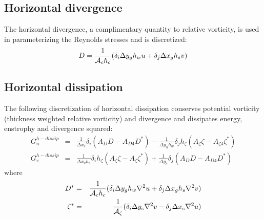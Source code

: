 \subsection{Horizontal divergence}

The horizontal divergence, a complimentary quantity to relative
vorticity, is used in parameterizing the Reynolds stresses and is
discretized:
\begin{equation}
D = \frac{1}{{\cal A}_c h_c} (
  \delta_i \Delta y_g h_w u
+ \delta_j \Delta x_g h_s v )
\end{equation}



\subsection{Horizontal dissipation}

The following discretization of horizontal dissipation conserves
potential vorticity (thickness weighted relative vorticity) and
divergence and dissipates energy, enstrophy and divergence squared:
\begin{eqnarray}
G_u^{h-dissip} & = &
  \frac{1}{\Delta x_c} \delta_i ( A_D D - A_{D4} D^*)
- \frac{1}{\Delta y_u h_w} \delta_j h_\zeta ( A_\zeta \zeta - A_{\zeta4} \zeta^* )
\\
G_v^{h-dissip} & = &
  \frac{1}{\Delta x_v h_s} \delta_i h_\zeta ( A_\zeta \zeta - A_\zeta \zeta^* )
+ \frac{1}{\Delta y_c} \delta_j ( A_D D - A_{D4} D^* )
\end{eqnarray}
where
\begin{eqnarray}
D^* & = & \frac{1}{{\cal A}_c h_c} (
  \delta_i \Delta y_g h_w \nabla^2 u
+ \delta_j \Delta x_g h_s \nabla^2 v ) \\
\zeta^* & = & \frac{1}{{\cal A}_\zeta} (
  \delta_i \Delta y_c \nabla^2 v
- \delta_j \Delta x_c \nabla^2 u )
\end{eqnarray}



